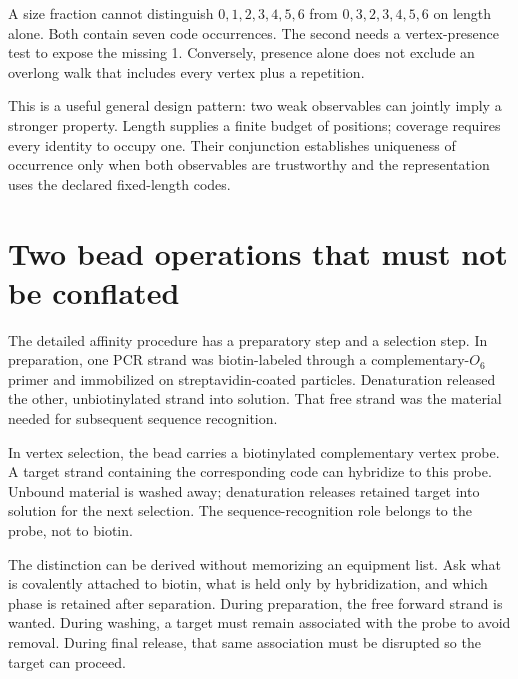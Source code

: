 A size fraction cannot distinguish $0,1,2,3,4,5,6$ from $0,3,2,3,4,5,6$ on length alone. Both contain seven code occurrences. The second needs a vertex-presence test to expose the missing 1. Conversely, presence alone does not exclude an overlong walk that includes every vertex plus a repetition.

This is a useful general design pattern: two weak observables can jointly imply a stronger property. Length supplies a finite budget of positions; coverage requires every identity to occupy one. Their conjunction establishes uniqueness of occurrence only when both observables are trustworthy and the representation uses the declared fixed-length codes.

\section{Two bead operations that must not be conflated}
The detailed affinity procedure has a preparatory step and a selection step. In preparation, one PCR strand was biotin-labeled through a complementary-$O_6$ primer and immobilized on streptavidin-coated particles. Denaturation released the other, unbiotinylated strand into solution. That free strand was the material needed for subsequent sequence recognition.

In vertex selection, the bead carries a biotinylated complementary vertex probe. A target strand containing the corresponding code can hybridize to this probe. Unbound material is washed away; denaturation releases retained target into solution for the next selection. The sequence-recognition role belongs to the probe, not to biotin.\cite{adleman}


The distinction can be derived without memorizing an equipment list. Ask what is covalently attached to biotin, what is held only by hybridization, and which phase is retained after separation. During preparation, the free forward strand is wanted. During washing, a target must remain associated with the probe to avoid removal. During final release, that same association must be disrupted so the target can proceed.

